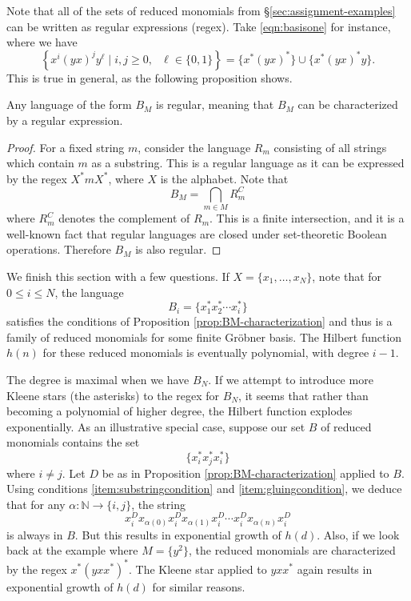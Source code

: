 Note that all of the sets of reduced monomials from \S\ref{sec:assignment-examples} can be written as regular expressions (regex). Take \eqref{eqn:basisone} for instance, where we have 
\[
	\left\{x^i(yx)^jy^\ell\mid i,j\ge 0,\text{ }\ell\in\{0,1\}\right\} = \{ x^* (yx)^* \} \cup \{ x^* (yx)^* y \}.
\]
This is true in general, as the following proposition shows.
\begin{prop}
	Any language of the form $B_M$ is regular, meaning that $B_M$ can be characterized by a regular expression.
\end{prop}
\begin{proof}
	For a fixed string $m$, consider the language $R_{m}$ consisting of all strings which contain $m$ as a substring. This is a regular language as it can be expressed by the regex $X^* m X^*$, where $X$ is the alphabet. Note that
	\[
	B_M = \bigcap_{m \in M} R_{m}^C
	\]
	where $R_m^C$ denotes the complement of $R_m$. This is a finite intersection, and it is a well-known fact that regular languages are closed under set-theoretic Boolean operations. Therefore $B_M$ is also regular.
\end{proof}

We finish this section with a few questions. If $X = \{x_1,\ldots,x_N\}$, note that for $0 \leq i \leq N$, the language
\[
	B_i = \{ x_1^* x_2^* \cdots x_i^* \}
\]
satisfies the conditions of Proposition \ref{prop:BM-characterization} and thus is a family of reduced monomials for some finite Gr\"obner basis. The Hilbert function $h(n)$ for these reduced monomials is eventually polynomial, with degree $i - 1$.

The degree is maximal when we have $B_N$. If we attempt to introduce more Kleene stars (the asterisks) to the regex for $B_N$, it seems that rather than becoming a polynomial of higher degree, the Hilbert function explodes exponentially. As an illustrative special case, suppose our set $B$ of reduced monomials contains the set
\[
	\{x_i^* x_j^* x_i^*\}
\]
where $i\neq j$.
Let $D$ be as in Proposition \ref{prop:BM-characterization} applied to $B$. Using conditions \eqref{item:substringcondition} and \eqref{item:gluingcondition}, we deduce that for any $\alpha\colon \mathbb{N} \to \{i,j\}$, the string
\[
	x_i^D x_{\alpha(0)} x_i^D x_{\alpha(1)} x_i^D \cdots x_i^D x_{\alpha(n)} x_i^D 
\]
is always in $B$. But this results in exponential growth of $h(d)$. Also, if we look back at the example where $M = \{y^2\}$, the reduced monomials are characterized by the regex $x^* (yxx^*)^*$. The Kleene star applied to $yxx^*$ again results in exponential growth of $h(d)$ for similar reasons.


